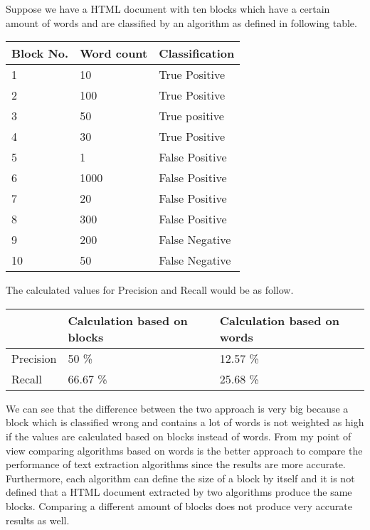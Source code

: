 Suppose we have a HTML document with ten blocks which have a certain amount of words and are classified by an algorithm as defined in following table.

\begin{tabular}{| p{3cm} | p{5cm} | p{5cm} | }
    \hline
    \textbf{Block No.}      & \textbf{Word count}  & \textbf{Classification} 				\\ \hline
    1     & 10      	&  True Positive	\\ \hline
    2     & 100     	&  True Positive	\\ \hline
    3     & 50       	&  True positive	\\ \hline
    4     & 30       	&  True Positive	\\ \hline
    5     & 1       	&  False Positive	\\ \hline
    6     & 1000      	&  False Positive	\\ \hline
    7     & 20      	&  False Positive	\\ \hline
    8     & 300       	&  False Positive	\\ \hline
    9     & 200       	&  False Negative	\\ \hline
    10    & 50        	&  False Negative	\\ \hline
\end{tabular}

The calculated values for Precision and Recall would be as follow.

\begin{tabular}{| p{3cm} | p{5cm} | p{5cm} | }
    \hline
    \     & \textbf{Calculation based on blocks}  & \textbf{Calculation based on words} 				\\ \hline
    Precision     & 50 \%    	&  12.57 \%	\\ \hline
    Recall & 66.67 \%    	&  25.68 \%	\\ \hline
\end{tabular}

We can see that the difference between the two approach is very big because a block which is classified wrong and contains a lot of words is not weighted as high if the values are calculated based on blocks instead of words. 
From my point of view comparing algorithms based on words is the better approach to compare the performance of text extraction algorithms since the results are more accurate. Furthermore, each algorithm can define the size of a block by itself and it is not defined that a HTML document extracted by two algorithms produce the same blocks. Comparing a different amount of blocks does not produce very accurate results as well.  

